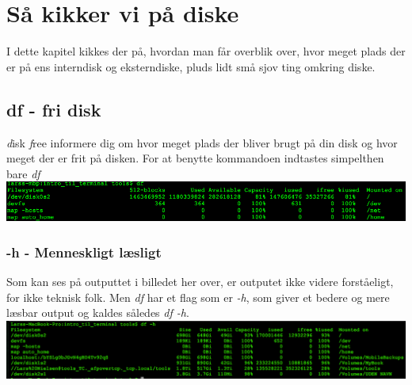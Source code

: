 \chapter{Så kikker vi på diske}
I dette kapitel kikkes der på, hvordan man får overblik over, hvor meget plads der er på ens interndisk og eksterndiske, pluds lidt små sjov ting
omkring diske.
\section{df - fri disk}
\textit{d}isk \textit{f}ree informere dig om hvor meget plads der bliver brugt på din disk og hvor meget der er frit på disken.
For at benytte kommandoen indtastes simpelthen bare \textit{df}
\\
\includegraphics[scale=0.55]{images/df_std.png}
\subsection{-h - Menneskligt læsligt}
Som kan ses på outputtet i billedet her over, er outputet ikke videre forståeligt, for ikke teknisk folk. Men \textit{df} har et flag som er \textit{-h}, som giver et bedere og mere læsbar output og kaldes således \textit{df -h}.\\
\includegraphics[scale=0.45]{images/df_h.png} 
